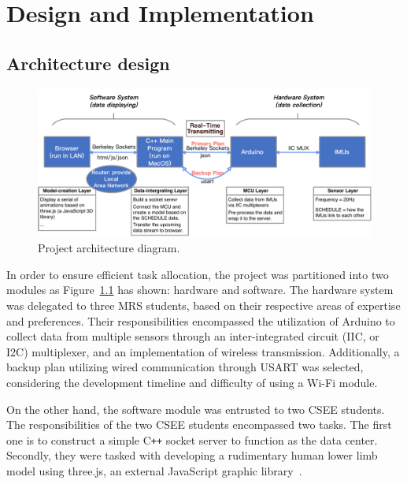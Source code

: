 \chapter{Design and Implementation}

\section{Architecture design}

\begin{figure}[htbp]
	\centering
	\includegraphics[clip, trim=0cm 0cm 0cm 0cm, width=1\textwidth]{
		fileForWriting/sketch_map}
	\caption[Project architecture diagram]{Project architecture diagram. }
	\label{fig:project-architecture-diagram}
\end{figure}

In order to ensure efficient task allocation, the project was partitioned into two modules as Figure~\ref{fig:project-architecture-diagram} has shown: hardware and software.
The hardware system was delegated to three MRS students, based on their respective areas of expertise and preferences.
Their responsibilities encompassed the utilization of Arduino to collect data from multiple sensors through an inter-integrated circuit (IIC, or I2C) multiplexer, and an implementation of wireless transmission.
Additionally, a backup plan utilizing wired communication through USART was selected, considering the development timeline and difficulty of using a Wi-Fi module.

On the other hand, the software module was entrusted to two CSEE students.
The responsibilities of the two CSEE students encompassed two tasks.
The first one is to construct a simple C\texttt{++} socket server to function as the data center.
Secondly, they were tasked with developing a rudimentary human lower limb model using three.js, an external JavaScript graphic library~\cite{threejs}.

